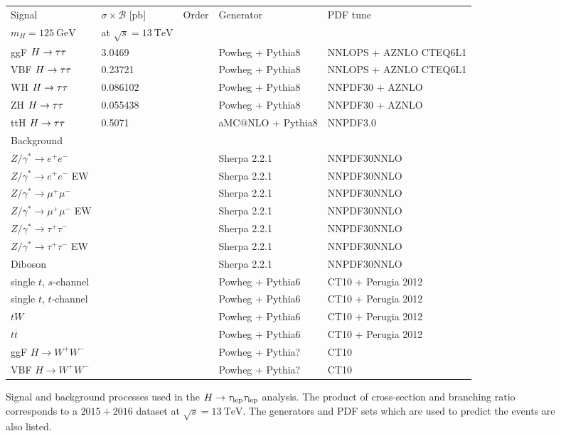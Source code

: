 \begin{sidewaysfigure}
    \centering
    \caption{Signal and background processes used in the $H \to \tau_\text{lep} \tau_\text{lep}$ analysis. The product of cross-section and branching ratio corresponds to a $2015+2016$ dataset
    at $\sqrt{s} = \SI{13}{\TeV}$. The generators and PDF sets which are used to predict the events are also listed.}\label{tab:processes:mc}
    \begin{tabular}{lllll}
        \toprule
        Signal  & $\sigma \times \mathcal{B}$ [\si{\pico\barn}] & Order & Generator & PDF tune \\ 
        $m_H = \SI{125}{\GeV}$ & at $\sqrt{s} = \SI{13}{\TeV}$ & & & \\ \midrule
        ggF $H \to \tau \tau$ & 3.0469   & & Powheg + Pythia8 & NNLOPS + AZNLO CTEQ6L1 \\
        VBF $H \to \tau \tau$ & 0.23721  & & Powheg + Pythia8 & NNLOPS + AZNLO CTEQ6L1 \\
        WH  $H \to \tau \tau$ & 0.086102 & & Powheg + Pythia8 & NNPDF30 + AZNLO \\
        ZH  $H \to \tau \tau$ & 0.055438 & & Powheg + Pythia8 & NNPDF30 + AZNLO \\
        ttH $H \to \tau \tau$ & 0.5071   & & aMC@NLO + Pythia8 & NNPDF3.0 \\ \midrule
        Background & & & & \\ \midrule
        $Z/\gamma^* \to e^+e^-$          & & & Sherpa 2.2.1 & NNPDF30NNLO \\
        $Z/\gamma^* \to e^+e^-$ EW       & & & Sherpa 2.2.1 & NNPDF30NNLO \\
        $Z/\gamma^* \to \mu^+\mu^-$      & & & Sherpa 2.2.1 & NNPDF30NNLO \\
        $Z/\gamma^* \to \mu^+\mu^-$ EW   & & & Sherpa 2.2.1 & NNPDF30NNLO \\
        $Z/\gamma^* \to \tau^+\tau^-$    & & & Sherpa 2.2.1 & NNPDF30NNLO \\
        $Z/\gamma^* \to \tau^+\tau^-$ EW & & & Sherpa 2.2.1 & NNPDF30NNLO \\
        Diboson & & & Sherpa 2.2.1 & NNPDF30NNLO \\
        single $t$, $s$-channel & & & Powheg + Pythia6 & CT10 + Perugia 2012 \\
        single $t$, $t$-channel & & & Powheg + Pythia6 & CT10 + Perugia 2012 \\
        $tW$ & & & Powheg + Pythia6 & CT10 + Perugia 2012 \\
        $t\overline{t}$  & & & Powheg + Pythia6 & CT10 + Perugia 2012 \\
        ggF $H \to W^+ W^-$ & & & Powheg + Pythia? & CT10 \\
        VBF $H \to W^+ W^-$ & & & Powheg + Pythia? & CT10 \\
        \bottomrule
    \end{tabular}
\end{sidewaysfigure}
